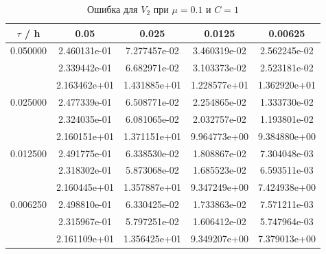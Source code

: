 \documentclass[specialist,subf,href,colorlinks=true,12pt
,times,mtpro,specialist
]{disser}
\begin{document}
\begin{table}[H]
\small
\caption{Ошибка для $V_2$ при $\mu=0.1$ и $C = 1$}
\begin{center}
\begin{tabular}{|c|c|c|c|c|}
\hline
$\tau$ / h & 0.05 & 0.025 & 0.0125 & 0.00625 \\
\hline
0.050000 & 2.460131e-01  & 7.277457e-02  & 3.460319e-02  & 2.562245e-02 \\
 & 2.339442e-01  & 6.682971e-02  & 3.103373e-02  & 2.523181e-02 \\
 & 2.163462e+01  & 1.431885e+01  & 1.228577e+01  & 1.362920e+01 \\
\hline
0.025000 & 2.477339e-01  & 6.508771e-02  & 2.254865e-02  & 1.333730e-02 \\
 & 2.324035e-01  & 6.081065e-02  & 2.032757e-02  & 1.193801e-02 \\
 & 2.160151e+01  & 1.371151e+01  & 9.964773e+00  & 9.384880e+00 \\
\hline
0.012500 & 2.491775e-01  & 6.338530e-02  & 1.808867e-02  & 7.304048e-03 \\
 & 2.318302e-01  & 5.873068e-02  & 1.685523e-02  & 6.593511e-03 \\
 & 2.160445e+01  & 1.357887e+01  & 9.347249e+00  & 7.424938e+00 \\
\hline
0.006250 & 2.498810e-01  & 6.330425e-02  & 1.733863e-02  & 7.571211e-03 \\
 & 2.315967e-01  & 5.797251e-02  & 1.606412e-02  & 5.747964e-03 \\
 & 2.161109e+01  & 1.356425e+01  & 9.349207e+00  & 7.379013e+00 \\
\hline
\end{tabular}
\end{center}
\end{table}
\end{document}
